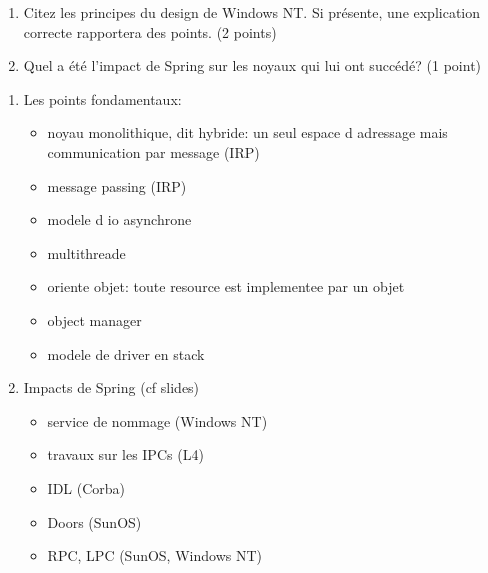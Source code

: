 \begin{enumerate}
  \item
	Citez les principes du design de Windows NT. Si pr\'esente, une explication
	correcte rapportera des points. (2 points)
  \item
	Quel a \'et\'e l'impact de Spring sur les noyaux qui lui ont succ\'ed\'e? (1 point)
\end{enumerate}

\begin{correction}

\begin{enumerate}
  \item
	Les points fondamentaux:
	\begin{itemize}
	  \item noyau monolithique, dit hybride: un seul espace d adressage mais
	  communication par message (IRP)
	  \item message passing (IRP)
          \item modele d io asynchrone
	  \item multithreade
	  \item oriente objet: toute resource est implementee par un objet
	  \item object manager
	  \item modele de driver en stack
	\end{itemize}
  \item
	Impacts de Spring (cf slides)
	\begin{itemize}
	  \item service de nommage (Windows NT)
	  \item travaux sur les IPCs (L4)
	  \item IDL (Corba)
	  \item Doors (SunOS)
	  \item RPC, LPC (SunOS, Windows NT)
	\end{itemize}
\end{enumerate}

\end{correction}


